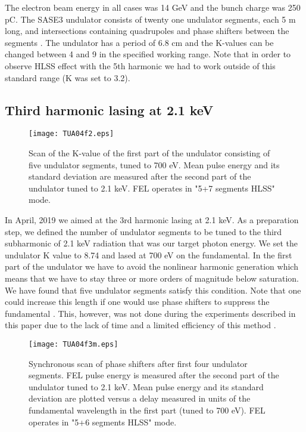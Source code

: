 \documentclass[aps,prl,preprint,groupedaddress,preprintnumbers]{revtex4}
\begin{document}
The electron beam energy in all cases was 14 GeV and the bunch charge was 250 pC. The SASE3 undulator consists of twenty one undulator segments, each 5 m long, and intersections containing quadrupoles and phase shifters between the segments
\cite{und}. The undulator has a period of 6.8 cm
and the K-values can be changed between 4 and 9 in the specified working range. Note that in order to
observe HLSS effect with the 5th harmonic we had to work outside of this standard range (K was set to 3.2).


\subsection{Third harmonic lasing at 2.1 keV}


\begin{figure}[t]
\texttt{[image: TUA04f2.eps]}

\caption{\small Scan of the K-value of the first part of the undulator consisting of five undulator
segments, tuned to 700 eV. Mean pulse energy and its standard deviation are
measured after the second part of the undulator tuned to 2.1 keV. FEL operates in "5+7 segments HLSS" mode.
}

\label{K-scan}
\end{figure}

In April, 2019 we aimed at the 3rd harmonic lasing at 2.1 keV.
As a preparation step, we defined the number of undulator segments
to be tuned to the third subharmonic of 2.1 keV radiation that was our target photon energy. We set the
undulator K value to 8.74 and lased at 700 eV on the fundamental. 
In the first part of the undulator we have to avoid the nonlinear harmonic generation which means that we have
to stay three or more orders of magnitude below saturation. We have found that five undulator segments
satisfy this condition. Note that one could increase this length if one would use phase shifters to suppress the fundamental \cite{mcneil}. This, however, was not done during the experiments described in this paper due to the lack of time and a limited efficiency of this method \cite{sy-harm,fl-harm-las}. 

\begin{figure}[tb]
\texttt{[image: TUA04f3m.eps]}

\caption{\small Synchronous scan of phase shifters after first four undulator segments.
FEL pulse energy is measured after the second part of the undulator
tuned to 2.1 keV. Mean pulse energy and its standard deviation are plotted
versus a delay measured in units of the fundamental wavelength in the first part (tuned to 700 eV).
FEL operates in "5+6 segments HLSS" mode. 
}

\label{PS-scan}
\end{figure}
\end{document}
